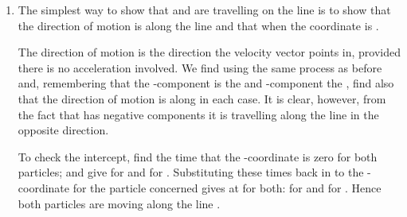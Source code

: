 \begin{problem}[A1988FMIVQ1a]
{\begin{enumerate}
The velocity of  with respect to  is simply :
\begin{align*} 
\vtr{v}_{\text{rel}} &= \vtr{v}_{C} - \vtr{v}_{A}\\ 
&= \left[(3t^{2} - 15)\vtr{i} + (-6t + 2)\vtr{j}\right] - \left[2\vtr{i} + 2\vtr{j}\right]\\ 
&= (3t^{2} - 17)\vtr{i} - (6t)\vtr{j} 
\end{align*}

At , the relative velocity is , which has a magnitude of  $=$  $=$ . The angle the velocity makes to  can be measured clockwise or anticlockwise, depending on convention. The vector makes an angle of  to the negative -axis, which is $157.4^{\circ}$ clockwise or equivalently $202.6^{\circ}$ anticlockwise.
	\item The simplest way to show that  and  are travelling on the line  is to show that the direction of motion is along the line  and that when  the  coordinate is .

The direction of motion is the direction the velocity vector points in, provided there is no acceleration involved. We find  using the same process as before and, remembering that the -component is the  and -component the , find also that the direction of motion is along  in each case. It is clear, however, from the fact that  has negative components it is travelling along the line in the opposite direction.

To check the intercept, find the time that the -coordinate is zero for both particles;  and  give  for  and  for . Substituting these times back in to the -coordinate for the particle concerned gives  at  for both:  for  and  for . Hence both particles are moving along the line .


\end{enumerate}}
\end{problem}
